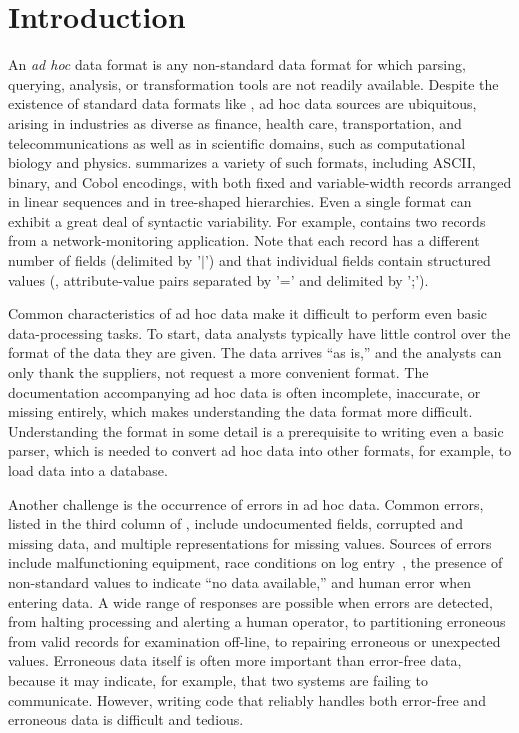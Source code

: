 \section{Introduction}
\label{sec:intro}

An {\em ad hoc} data format is any non-standard data format for which
parsing, querying, analysis, or transformation tools are not readily
available.  Despite the existence of standard
data formats like \xml{}, ad hoc data sources are ubiquitous,
arising in industries as diverse as finance, health care,
transportation, and telecommunications as well as in scientific
domains, such as computational biology and physics.
 summarizes a variety of such formats,
including ASCII, binary, and Cobol encodings, with both fixed and
variable-width records arranged in linear sequences and in tree-shaped
hierarchies.  Even a single format can exhibit a great deal of
syntactic variability.  For example, 
contains two records from a network-monitoring application.  Note that
each record has a different number of fields (delimited by '$|$') and
that individual fields contain structured values (\eg{},
attribute-value pairs separated by '=' and delimited by ';').

Common characteristics of ad hoc data make it difficult to perform
even basic data-processing tasks.  To start, data analysts typically
have little control over the format of the data they are given.  The
data arrives ``as is,'' and the analysts can only thank the suppliers,
not request a more convenient format.  The documentation accompanying
ad hoc data is often incomplete, inaccurate, or missing entirely,
which makes understanding the data format more difficult.
Understanding the format in some detail is a prerequisite to writing
even a basic parser, which is needed to convert ad hoc data into other
formats, for example, to load data into a database.

Another challenge is the occurrence of errors in ad hoc data.  Common
errors, listed in the third column of ,
include undocumented fields, corrupted and missing data, and multiple
representations for missing values.  Sources of errors include
malfunctioning equipment, race conditions on log entry~\cite{wpp}, the
presence of non-standard values to indicate ``no data available,'' and
human error when entering data.  A wide range of responses are
possible when errors are detected, from halting processing and
alerting a human operator, to partitioning erroneous from valid
records for examination off-line, to repairing erroneous or unexpected
values.  Erroneous data itself is often more important than error-free
data, because it may indicate, for example, that two systems are
failing to communicate.  However, writing code that reliably handles
both error-free and erroneous data is difficult and tedious.

